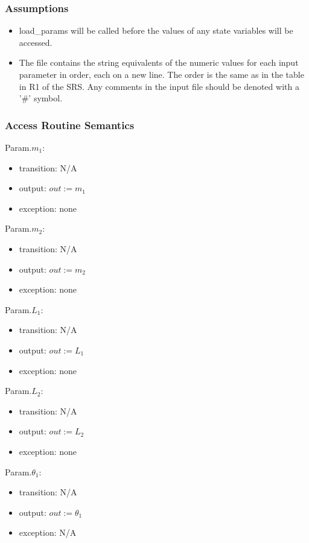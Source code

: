\documentclass[12pt, titlepage]{article}
\begin{document}
\subsubsection{Assumptions}
\begin{itemize}
\item load\_params will be called before the values of any state variables will be accessed.

\item The file contains the string equivalents of the numeric values for
each input parameter in order, each on a new line. The order is the same as in
the table in R1 of the SRS. Any comments in the input file should be denoted
with a '\#' symbol.
\end{itemize}
\subsubsection{Access Routine Semantics}

\noindent Param.$m_1$:
\begin{itemize}
\item transition: N/A
\item output: $out := m_1$
\item exception: none
\end{itemize}

\noindent Param.$m_2$:
\begin{itemize}
\item transition: N/A
\item output: $out := m_2$
\item exception: none
\end{itemize}

\noindent Param.$L_1$:
\begin{itemize}
\item transition: N/A
\item output: $out := L_1$
\item exception: none
\end{itemize}

\noindent Param.$L_2$:
\begin{itemize}
\item transition: N/A
\item output: $out := L_2$
\item exception: none
\end{itemize}

\noindent Param.$\theta_1$:
\begin{itemize}
\item transition: N/A
\item output: $out := \theta_1$
\item exception: N/A
\end{itemize}
\end{document}
